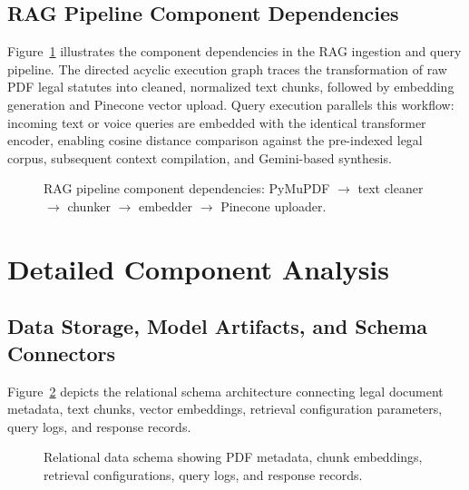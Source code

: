 \documentclass[12pt,a4paper]{report}
\begin{document}
\subsection{RAG Pipeline Component Dependencies}
Figure~\ref{fig:dag_scheduling_walkthrough} illustrates the component dependencies in the RAG ingestion and query pipeline. The directed acyclic execution graph traces the transformation of raw PDF legal statutes into cleaned, normalized text chunks, followed by embedding generation and Pinecone vector upload. Query execution parallels this workflow: incoming text or voice queries are embedded with the identical transformer encoder, enabling cosine distance comparison against the pre-indexed legal corpus, subsequent context compilation, and Gemini-based synthesis.

\begin{figure}[htbp]
    \centering
    \caption{RAG pipeline component dependencies: PyMuPDF $\to$ text cleaner $\to$ chunker $\to$ embedder $\to$ Pinecone uploader.}
    \label{fig:dag_scheduling_walkthrough}
\end{figure}

\section{Detailed Component Analysis}

\subsection{Data Storage, Model Artifacts, and Schema Connectors}
Figure~\ref{fig:db_schema} depicts the relational schema architecture connecting legal document metadata, text chunks, vector embeddings, retrieval configuration parameters, query logs, and response records.

\begin{figure}[htbp]
    \centering
    \caption{Relational data schema showing PDF metadata, chunk embeddings, retrieval configurations, query logs, and response records.}
    \label{fig:db_schema}
\end{figure}
\end{document}
